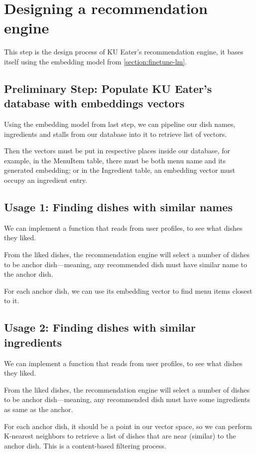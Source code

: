 \section{Designing a recommendation engine}
This step is the design process of KU Eater's recommendation engine,
it bases itself using the embedding model from \ref{section:finetune-lm}.

\subsection{Preliminary Step: Populate KU Eater's database with embeddings vectors}
Using the embedding model from last step, we can pipeline our dish names,
ingredients and stalls from our database into it to retrieve list of vectors.

Then the vectors must be put in respective places inside our database, for example,
in the MenuItem table, there must be both menu name and its generated embedding;
or in the Ingredient table, an embedding vector must occupy an ingredient entry.

\subsection{Usage 1: Finding dishes with similar names}
We can implement a function that reads from user profiles, to see what dishes they liked.

From the liked dishes, the recommendation engine will select a number of dishes
to be anchor dish---meaning, any recommended dish must have similar name to the anchor dish.

For each anchor dish, we can use its embedding vector to
find menu items closest to it.

\subsection{Usage 2: Finding dishes with similar ingredients}
We can implement a function that reads from user profiles, to see what dishes they liked.

From the liked dishes, the recommendation engine will select a number of dishes
to be anchor dish---meaning, any recommended dish must have some ingredients as same as the anchor.

For each anchor dish, it should be a point in our vector space, so we can perform
K-nearest neighbors to retrieve a list of dishes that are near (similar) to the anchor dish.
This is a content-based filtering process.

